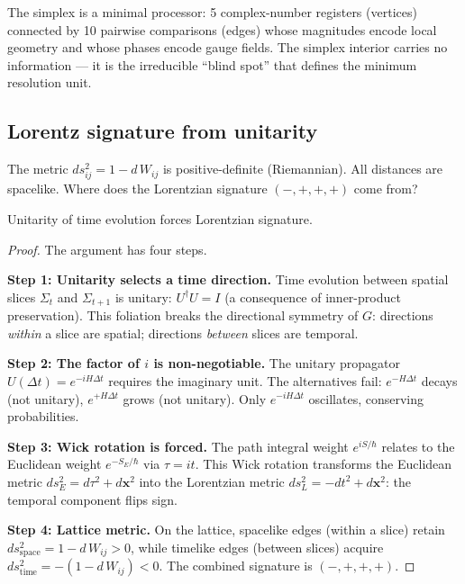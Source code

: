 The simplex is a minimal processor: 5 complex-number registers (vertices) connected by 10 pairwise comparisons (edges) whose magnitudes encode local geometry and whose phases encode gauge fields. The simplex interior carries no information --- it is the irreducible ``blind spot'' that defines the minimum resolution unit.

\subsection{Lorentz signature from unitarity}
\label{sec:Lorentz}

The metric $ds^2_{ij} = 1 - d\,W_{ij}$ is positive-definite (Riemannian). All distances are spacelike. Where does the Lorentzian signature $(-,+,+,+)$ come from?

\begin{theorem}
Unitarity of time evolution forces Lorentzian signature.
\end{theorem}

\begin{proof}
The argument has four steps.

\medskip
\noindent\textbf{Step 1: Unitarity selects a time direction.}
Time evolution between spatial slices $\Sigma_t$ and $\Sigma_{t+1}$ is unitary: $U^\dagger U = I$ (a consequence of inner-product preservation). This foliation breaks the directional symmetry of $G$: directions \emph{within} a slice are spatial; directions \emph{between} slices are temporal.

\medskip
\noindent\textbf{Step 2: The factor of $i$ is non-negotiable.}
The unitary propagator $U(\Delta t) = e^{-iH\Delta t}$ requires the imaginary unit. The alternatives fail: $e^{-H\Delta t}$ decays (not unitary), $e^{+H\Delta t}$ grows (not unitary). Only $e^{-iH\Delta t}$ oscillates, conserving probabilities.

\medskip
\noindent\textbf{Step 3: Wick rotation is forced.}
The path integral weight $e^{iS/\hbar}$ relates to the Euclidean weight $e^{-S_E/\hbar}$ via $\tau = it$. This Wick rotation transforms the Euclidean metric $ds^2_E = d\tau^2 + d\mathbf{x}^2$ into the Lorentzian metric $ds^2_L = -dt^2 + d\mathbf{x}^2$: the temporal component flips sign.

\medskip
\noindent\textbf{Step 4: Lattice metric.}
On the lattice, spacelike edges (within a slice) retain $ds^2_\text{space} = 1 - d\,W_{ij} > 0$, while timelike edges (between slices) acquire $ds^2_\text{time} = -(1 - d\,W_{ij}) < 0$. The combined signature is $(-,+,+,+)$.
\end{proof}


